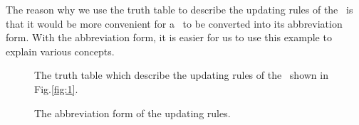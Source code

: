 \begin{example}
The reason why we use the truth table to describe the updating rules of the \BCN\ is that it would be more convenient for a \BCN\ to be converted into its abbreviation form. With the abbreviation form, it is easier for us to use this example to explain various concepts.
  \begin{figure}[thpb]
      \centering
      
      \caption{The truth table which describe the updating rules of the \BCN\ shown in Fig.\ref{fig:1}.}
      \label{fig:2}
   \end{figure}
   \begin{figure}[thpb]
      \centering
      
      \caption{The abbreviation form of the updating rules.}
      \label{fig:6}
   \end{figure}
   \label{exa:2}
\end{example}   


